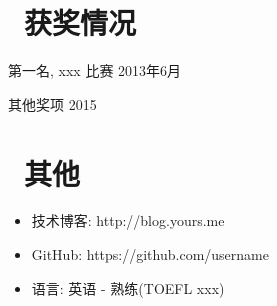\documentclass[11pt]{article}
\begin{document}
\section{\makebox[\widthof{\faGraduationCap}][c]{\color{CVBlue}\faHeart}\ 获奖情况}
第一名, xxx 比赛 \hfill 2013年6月

其他奖项 \hfill 2015

\section{\makebox[\widthof{\faGraduationCap}][c]{\color{CVBlue}\faInfo}\ 其他}
\begin{itemize}[parsep=0.5ex]
  \item 技术博客: http://blog.yours.me
  \item GitHub: https://github.com/username
  \item 语言: 英语 - 熟练(TOEFL xxx)
\end{itemize}

\end{document}
